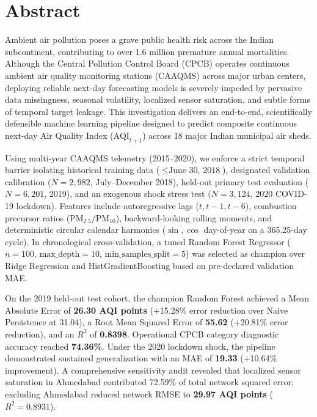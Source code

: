 \documentclass[11pt,a4paper]{report}
\begin{document}

\chapter*{Abstract}
Ambient air pollution poses a grave public health risk across the Indian subcontinent, contributing to over 1.6 million premature annual mortalities. Although the Central Pollution Control Board (CPCB) operates continuous ambient air quality monitoring stations (CAAQMS) across major urban centers, deploying reliable next-day forecasting models is severely impeded by pervasive data missingness, seasonal volatility, localized sensor saturation, and subtle forms of temporal target leakage. This investigation delivers an end-to-end, scientifically defensible machine learning pipeline designed to predict composite continuous next-day Air Quality Index ($\text{AQI}_{t+1}$) across 18 major Indian municipal air sheds.

Using multi-year CAAQMS telemetry (2015--2020), we enforce a strict temporal barrier isolating historical training data ($\le \text{June 30, 2018}$), designated validation calibration ($N=2,982$, July--December 2018), held-out primary test evaluation ($N=6,201$, 2019), and an exogenous shock stress test ($N=3,124$, 2020 COVID-19 lockdown). Features include autoregressive lags ($t, t-1, t-6$), combustion precursor ratios ($\text{PM}_{2.5} / \text{PM}_{10}$), backward-looking rolling moments, and deterministic circular calendar harmonics ($\sin, \cos$ day-of-year on a 365.25-day cycle). In chronological cross-validation, a tuned Random Forest Regressor ($n=100$, $\text{max\_depth}=10$, $\text{min\_samples\_split}=5$) was selected as champion over Ridge Regression and HistGradientBoosting based on pre-declared validation MAE.

On the 2019 held-out test cohort, the champion Random Forest achieved a Mean Absolute Error of \textbf{26.30 AQI points} (+15.28\% error reduction over Naive Persistence at 31.04), a Root Mean Squared Error of \textbf{55.62} (+20.81\% error reduction), and an $R^2$ of \textbf{0.8398}. Operational CPCB category diagnostic accuracy reached \textbf{74.36\%}. Under the 2020 lockdown shock, the pipeline demonstrated sustained generalization with an MAE of \textbf{19.33} (+10.64\% improvement). A comprehensive sensitivity audit revealed that localized sensor saturation in Ahmedabad contributed 72.59\% of total network squared error; excluding Ahmedabad reduced network RMSE to \textbf{29.97 AQI points} ($R^2 = 0.8931$).
\end{document}
